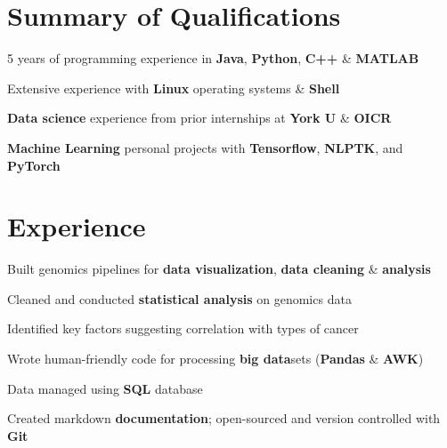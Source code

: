 \documentclass[]{chandan-cv}
\begin{document}
\begin{minipage}[t]{0.71\textwidth}


\section{Summary of Qualifications}
\runsubsection{ }
\descript{ }
\location{ }
\vspace{\topsep} %
\begin{tightemize}
	\item 5 years of programming experience in \textbf{Java}, \textbf{Python}, \textbf{C++} \& \textbf{MATLAB}
	\item Extensive experience with \textbf{Linux} operating systems \& \textbf{Shell}
	\item \textbf{Data science} experience from prior internships at \textbf{York U} \& \textbf{OICR}
	\item \textbf{Machine Learning} personal projects with \textbf{Tensorflow}, \textbf{NLPTK}, and \textbf{PyTorch}
\end{tightemize}
\sectionsep


\section{Experience}
\begin{tightemize}
	\item Built genomics pipelines for \textbf{data visualization}, \textbf{data cleaning} \& \textbf{analysis}
	\item Cleaned and conducted \textbf{statistical analysis} on genomics data
	\item Identified key factors suggesting correlation with types of cancer
	\item Wrote human-friendly code for processing \textbf{big data}sets (\textbf{Pandas} \& \textbf{AWK})
	\item Data managed using \textbf{SQL} database
	\item Created markdown \textbf{documentation}; open-sourced and version controlled with \textbf{Git}
\end{tightemize}
\sectionsep


\end{minipage}
\end{document}
